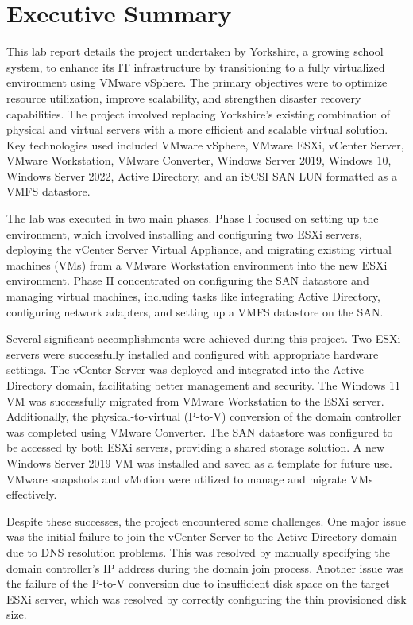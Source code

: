 \documentclass[letterpaper,12pt]{article}
\date{\today}
\title{}
\begin{document}
\tableofcontents

\newpage
\setcounter{tocdepth}{2}
\tableofcontents

\section{Executive Summary}
\label{sec:org6a95662}
This lab report details the project undertaken by Yorkshire, a growing school system, to enhance its IT infrastructure by transitioning to a fully virtualized environment using VMware vSphere. The primary objectives were to optimize resource utilization, improve scalability, and strengthen disaster recovery capabilities. The project involved replacing Yorkshire's existing combination of physical and virtual servers with a more efficient and scalable virtual solution. Key technologies used included VMware vSphere, VMware ESXi, vCenter Server, VMware Workstation, VMware Converter, Windows Server 2019, Windows 10, Windows Server 2022, Active Directory, and an iSCSI SAN LUN formatted as a VMFS datastore.

The lab was executed in two main phases. Phase I focused on setting up the environment, which involved installing and configuring two ESXi servers, deploying the vCenter Server Virtual Appliance, and migrating existing virtual machines (VMs) from a VMware Workstation environment into the new ESXi environment. Phase II concentrated on configuring the SAN datastore and managing virtual machines, including tasks like integrating Active Directory, configuring network adapters, and setting up a VMFS datastore on the SAN.

Several significant accomplishments were achieved during this project. Two ESXi servers were successfully installed and configured with appropriate hardware settings. The vCenter Server was deployed and integrated into the Active Directory domain, facilitating better management and security. The Windows 11 VM was successfully migrated from VMware Workstation to the ESXi server. Additionally, the physical-to-virtual (P-to-V) conversion of the domain controller was completed using VMware Converter. The SAN datastore was configured to be accessed by both ESXi servers, providing a shared storage solution. A new Windows Server 2019 VM was installed and saved as a template for future use. VMware snapshots and vMotion were utilized to manage and migrate VMs effectively.

Despite these successes, the project encountered some challenges. One major issue was the initial failure to join the vCenter Server to the Active Directory domain due to DNS resolution problems. This was resolved by manually specifying the domain controller's IP address during the domain join process. Another issue was the failure of the P-to-V conversion due to insufficient disk space on the target ESXi server, which was resolved by correctly configuring the thin provisioned disk size.
\end{document}
